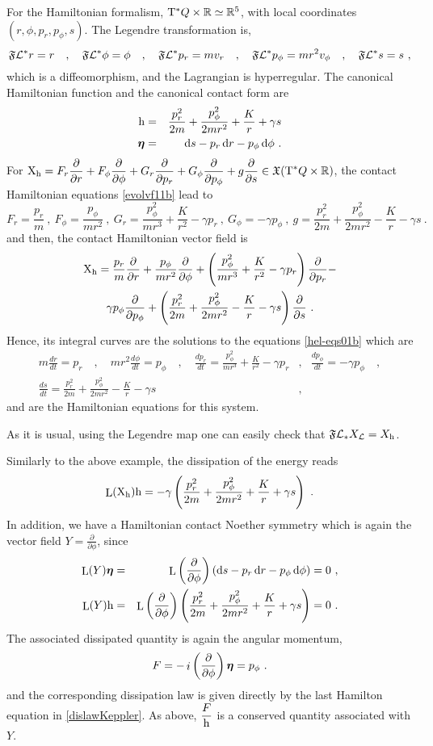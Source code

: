 \documentclass[12pt]{report}
\def\bea{\begin{eqnarray}}
\def\eea{\end{eqnarray}}
\def\beann{\begin{eqnarray*}}
\def\eeann{\end{eqnarray*}}
\def\dst{\displaystyle}
\def\derpar#1#2{\frac{\partial{#1}}{\partial{#2}}}
\def\vf{\mathfrak X}
\def\Lag{{\cal L}}
\def\d{{\rm d}}
\def\Real{\mathbb{R}}
\def\bmeta{\mbox{\boldmath $\eta$}}
\def\X{{\rm X}}
\def\Tan{{\rm T}}
\def\Lie{\mathop{\rm L}\nolimits}
\def\inn{\mathop{i}\nolimits}
\begin{document}
For the Hamiltonian formalism, $\Tan^*Q\times\Real\simeq\Real^5$,
with local coordinates $(r,\phi,p_r,p_\phi,s)$. The Legendre transformation is,
$$
\mathfrak{F}\Lag^*r=r  \quad , \quad \mathfrak{F}\Lag^*\phi=\phi \quad , \quad
\mathfrak{F}\Lag^*p_r=mv_r  \quad , \quad \mathfrak{F}\Lag^*p_\phi=mr^2v_\phi \quad , \quad \mathfrak{F}\Lag^*s=s  \ ,
$$
which is a diffeomorphism, and the Lagrangian is hyperregular.
The canonical Hamiltonian function and the canonical contact form are
\beann
{\rm h}&=&\frac{p_r^2}{2m}+\frac{p_\phi^2}{2mr^2}+\frac{K}{r}+\gamma s \\
\bmeta&=&\d s-p_r\,\d r-p_\phi\,\d\phi \ .
\eeann
For $\displaystyle \X_{\rm h}=F_r\derpar{}{r}+F_\phi\derpar{}{\phi}+
G_r\derpar{}{p_r}+G_\phi\derpar{}{p_\phi}+g\derpar{}{s}\in\vf(\Tan^*Q\times\Real)$,
the contact Hamiltonian equations \eqref{evolvf11b} lead to
$$
F_r=\frac{p_r}{m} \ , \ F_\phi=\frac{p_\phi}{mr^2} \ , \
G_r=\frac{p_\phi^2}{mr^3}+\frac{K}{r^2}-\gamma p_r \ , \ G_\phi=-\gamma p_\phi  \ , \ g=\frac{p_r^2}{2m}+\frac{p_\phi^2}{2mr^2}-\frac{K}{r}-\gamma s \ .
$$
and then, the contact Hamiltonian vector field is
\begin{multline*}
\X_{\rm h}=\frac{p_r}{m}\derpar{}{r}+\frac{p_\phi}{mr^2}\derpar{}{\phi}+\left(\frac{p_\phi^2}{mr^3}+
\frac{K}{r^2}-\gamma p_r\right)\derpar{}{p_r}-\\
\gamma p_\phi\derpar{}{p_\phi}+
\left(\frac{p_r^2}{2m}+\frac{p_\phi^2}{2mr^2}-
\frac{K}{r}-\gamma s\right)\derpar{}{s} \ .
\end{multline*}
Hence, its integral curves are the solutions to the equations \eqref{hel-eqs01b} which are
\bea
m\frac{dr}{dt} =p_r \quad , \quad mr^2\frac{d\phi}{dt} =p_\phi \quad , \quad
\frac{dp_r}{dt}=\frac{p_\phi^2}{mr^3}+\frac{K}{r^2}-\gamma p_r & , &
\frac{dp_\phi}{dt}=-\gamma p_\phi \quad ,
\label{dislawKeppler} \\
\frac{ds}{dt}=\frac{p_r^2}{2m}+\frac{p_\phi^2}{2mr^2}-\frac{K}{r}-\gamma s & , & \nonumber
\eea
and are the Hamiltonian equations for this system.

As it is usual, using the Legendre map
one can easily check that $\mathfrak{F}\Lag_*X_\Lag=X_{\rm h}$.

Similarly to the above example,
the dissipation of the energy reads
$$
\Lie(\X_{\rm h}){\rm h}=-\gamma \left(\frac{p_r^2}{2m}+\frac{p_\phi^2}{2mr^2}+\frac{K}{r}+\gamma s\right)\ .
$$
In addition, we have a Hamiltonian contact Noether symmetry which is again the
vector field $\dst Y=\derpar{}{\phi}$, since
\beann
\Lie(Y)\bmeta&=& 
\Lie\left(\derpar{}{\phi}\right)\left(\d s-p_r\,\d r-p_\phi\,\d\phi\right) =0 \ , 
\\
\Lie(Y){\rm h}&=& 
\Lie\left(\derpar{}{\phi}\right)\left(\frac{p_r^2}{2m}+\frac{p_\phi^2}{2mr^2}+\frac{K}{r}+\gamma s\right)=0 \ .
\eeann
The associated dissipated quantity is again the angular momentum,
$$
F=-\inn\left(\derpar{}{\phi}\right)\bmeta=p_\phi \ .
$$
and the corresponding dissipation law is given directly by the last Hamilton equation in \eqref{dislawKeppler}.
As above, $\dst\frac{F}{{\rm h}}$ is a conserved quantity associated with $Y$.
\end{document}
